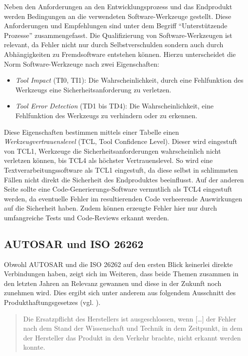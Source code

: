 \documentclass[
  a4paper,					    %
  twoside,
  DIV=calc,     				%
  bibliography=totoc,
  cleardoublepage=empty,
  ngerman,     					%
  final       					%
]{scrbook}
\begin{document}
Neben den Anforderungen an den Entwicklungsprozess und das Endprodukt werden Bedingungen an die verwendeten Software-Werkzeuge gestellt. Diese Anforderungen und Empfehlungen sind unter dem Begriff "`Unterstützende Prozesse"' zusammengefasst. Die Qualifizierung von Software-Werkzeugen ist relevant, da Fehler nicht nur durch Selbstverschulden sondern auch durch Abhängigkeiten zu Fremdsoftware entstehen können. Hierzu unterscheidet die Norm Software-Werkzeuge nach zwei Eigenschaften:

\begin{itemize}
    \item \emph{Tool Impact} (TI0, TI1): Die Wahrscheinlichkeit, durch eine Fehlfunktion des Werkzeugs eine Sicherheitsanforderung zu verletzen.
    \item \emph{Tool Error Detection} (TD1 bis TD4): Die Wahrscheinlichkeit, eine Fehlfunktion des Werkzeugs zu verhindern oder zu erkennen.
\end{itemize}

Diese Eigenschaften bestimmen mittels einer Tabelle einen \emph{Werkzeugvertrauenslevel} (TCL, Tool Confidence Level). Dieser wird eingestuft von TCL1, Werkzeuge die Sicherheitsanforderungen wahrscheinlich nicht verletzen können, bis TCL4 als höchster Vertrauenslevel. So wird eine Textverarbeitungssoftware als TCL1 eingestuft, da diese selbst in schlimmsten Fällen nicht direkt die Sicherheit des Endproduktes beeinflusst. Auf der anderen Seite sollte eine Code-Generierungs-Software vermutlich als TCL4 eingestuft werden, da eventuelle Fehler im resultierenden Code verheerende Auswirkungen auf die Sicherheit haben. Zudem können erzeugte Fehler hier nur durch umfangreiche Tests und Code-Reviews erkannt werden.




\subsection{AUTOSAR und ISO 26262}
\label{sec:ISO26262_autosar}
Obwohl AUTOSAR und die ISO 26262 auf den ersten Blick keinerlei direkte Verbindungen haben, zeigt sich im Weiteren, dass beide Themen zusammen in den letzten Jahren an Relevanz gewannen und diese in der Zukunft noch zunehmen wird. Dies ergibt sich unter anderem aus folgendem Ausschnitt des Produkthaftungsgesetzes (vgl. \cite{ProdG}).

\begin{quote}
Die Ersatzpflicht des Herstellers ist ausgeschlossen, wenn [\dots] der Fehler nach dem Stand der Wissenschaft und Technik in dem Zeitpunkt, in dem der Hersteller das Produkt in den Verkehr brachte, nicht erkannt werden konnte.
\end{quote}
\end{document}
